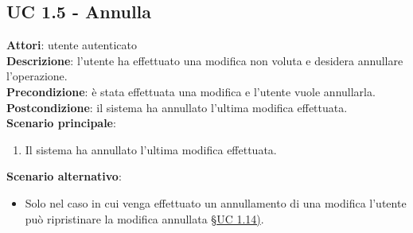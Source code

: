 \subsection{UC 1.5 - Annulla}{
	\label{uc1.5}
	\textbf{Attori}: utente autenticato \\
	\textbf{Descrizione}: l'utente ha effettuato una modifica non voluta e desidera annullare l'operazione. \\
	\textbf{Precondizione}: è stata effettuata una modifica e l'utente vuole annullarla.	\\
	\textbf{Postcondizione}: il sistema ha annullato l'ultima modifica effettuata.	\\
	\textbf{Scenario principale}:
	\begin{enumerate}
		\item Il sistema ha annullato l'ultima modifica effettuata.
	\end{enumerate}				
	\textbf{Scenario alternativo}: 
	\begin{itemize}
		\item Solo nel caso in cui venga effettuato un annullamento di una modifica l'utente può ripristinare la modifica annullata \S\hyperref[uc1.14]{UC 1.14)}.
	\end{itemize}
	}
